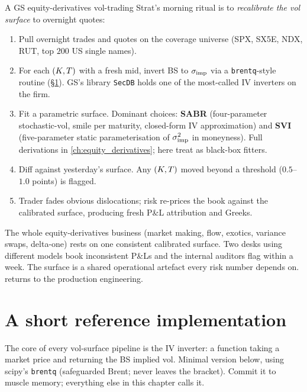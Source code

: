 \begin{gsbox}
A GS equity-derivatives vol-trading Strat's morning ritual is to
\emph{recalibrate the vol surface} to overnight quotes:
\begin{enumerate}
  \item Pull overnight trades and quotes on the coverage universe
  (SPX, SX5E, NDX, RUT, top $200$ US single names).
  \item For each $(K, T)$ with a fresh mid, invert BS
  to $\sigma_{\text{imp}}$ via a \texttt{brentq}-style routine
  (\S\ref{sec:ch17_code}). GS's library \texttt{SecDB} holds one
  of the most-called IV inverters on the firm.
  \item Fit a parametric surface. Dominant choices:
  \textbf{SABR} (four-parameter stochastic-vol, smile per
  maturity, closed-form IV approximation) and \textbf{SVI}
  (five-parameter static parameterisation of
  $\sigma_{\text{imp}}^2$ in moneyness). Full derivations in
  \cref{ch:equity_derivatives}; here treat as black-box fitters.
  \item Diff against yesterday's surface. Any
  $(K, T)$ moved beyond a threshold
  ($0.5$--$1.0$ points) is flagged.
  \item Trader fades obvious dislocations; risk re-prices the
  book against the calibrated surface, producing fresh P\&L
  attribution and Greeks.
\end{enumerate}
The whole equity-derivatives business (market making, flow,
exotics, variance swaps, delta-one) rests on one consistent
calibrated surface. Two desks using different models book
inconsistent P\&Ls and the internal auditors flag within a week.
The surface is a shared operational artefact every risk number
depends on.  returns to the production
engineering.
\end{gsbox}

\section{A short reference implementation}
\label{sec:ch17_code}

The core of every vol-surface pipeline is the IV inverter: a
function taking a market price and returning the BS implied vol.
Minimal version below, using scipy's \texttt{brentq} (safeguarded
Brent; never leaves the bracket). Commit it to muscle memory;
everything else in this chapter calls it.


